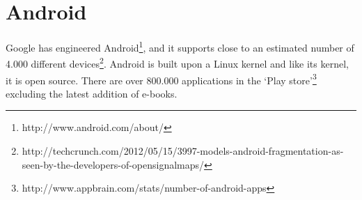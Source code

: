 \section{Android}
Google has engineered Android\footnote{http://www.android.com/about/}, and it supports close to an estimated number of 4.000 different devices\footnote{http://techcrunch.com/2012/05/15/3997-models-android-fragmentation-as-seen-by-the-developers-of-opensignalmaps/}. Android is built upon a Linux kernel and like its kernel, it is open source. There are over 800.000 applications in the `Play store'\footnote{http://www.appbrain.com/stats/number-of-android-apps} excluding the latest addition of e-books.
